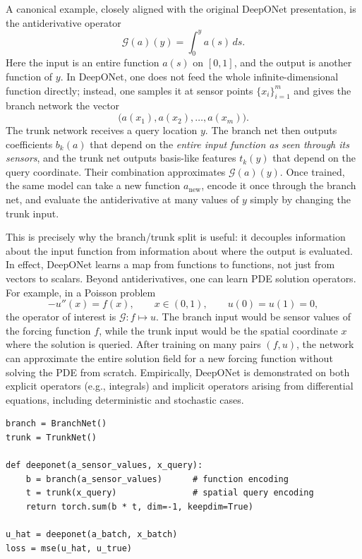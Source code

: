 \documentclass[11pt]{article}
\begin{document}
A canonical example, closely aligned with the original DeepONet presentation, is the antiderivative operator
\begin{equation}
\mathcal{G}(a)(y)=\int_0^y a(s)\,ds.
\end{equation}
Here the input is an entire function $a(s)$ on $[0,1]$, and the output is another function of $y$. In DeepONet, one does not feed the whole infinite-dimensional function directly; instead, one samples it at sensor points $\{x_i\}_{i=1}^m$ and gives the branch network the vector
\begin{equation}
\big(a(x_1),a(x_2),\dots,a(x_m)\big).
\end{equation}
The trunk network receives a query location $y$. The branch net then outputs coefficients $b_k(a)$ that depend on the \emph{entire input function as seen through its sensors}, and the trunk net outputs basis-like features $t_k(y)$ that depend on the query coordinate. Their combination approximates $\mathcal{G}(a)(y)$. Once trained, the same model can take a new function $a_{\mathrm{new}}$, encode it once through the branch net, and evaluate the antiderivative at many values of $y$ simply by changing the trunk input.

This is precisely why the branch/trunk split is useful: it decouples information about the input function from information about where the output is evaluated. In effect, DeepONet learns a map from functions to functions, not just from vectors to scalars. Beyond antiderivatives, one can learn PDE solution operators. For example, in a Poisson problem
\begin{equation}
-u''(x)=f(x), \qquad x\in(0,1), \qquad u(0)=u(1)=0,
\end{equation}
the operator of interest is $\mathcal{G}: f \mapsto u$. The branch input would be sensor values of the forcing function $f$, while the trunk input would be the spatial coordinate $x$ where the solution is queried. After training on many pairs $(f,u)$, the network can approximate the entire solution field for a new forcing function without solving the PDE from scratch. Empirically, DeepONet is demonstrated on both explicit operators (e.g., integrals) and implicit operators arising from differential equations, including deterministic and stochastic cases.

\begin{lstlisting}[style=scimlpython,caption={Representative DeepONet forward pass.},label={lst:deeponet}]
branch = BranchNet()
trunk = TrunkNet()

def deeponet(a_sensor_values, x_query):
    b = branch(a_sensor_values)      # function encoding
    t = trunk(x_query)               # spatial query encoding
    return torch.sum(b * t, dim=-1, keepdim=True)

u_hat = deeponet(a_batch, x_batch)
loss = mse(u_hat, u_true)
\end{lstlisting}
\end{document}
